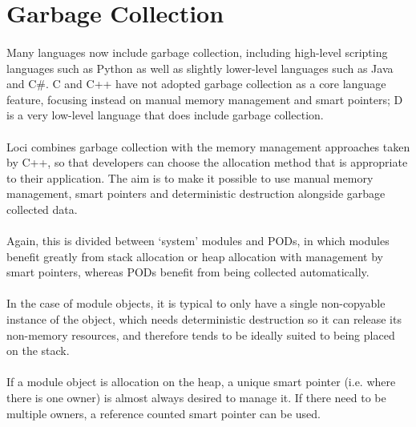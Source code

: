 \documentclass[12pt,twoside,notitlepage]{report}
\begin{document}
\paragraph{}


\section{Garbage Collection}

\paragraph{}
Many languages now include garbage collection, including high-level scripting languages such as Python as well as slightly lower-level languages such as Java and C\#. C and C++ have not adopted garbage collection as a core language feature, focusing instead on manual memory management and smart pointers; D is a very low-level language that does include garbage collection.

\paragraph{}
Loci combines garbage collection with the memory management approaches taken by C++, so that developers can choose the allocation method that is appropriate to their application. The aim is to make it possible to use manual memory management, smart pointers and deterministic destruction alongside garbage collected data.

\paragraph{}
Again, this is divided between `system' modules and PODs, in which modules benefit greatly from stack allocation or heap allocation with management by smart pointers, whereas PODs benefit from being collected automatically.

\paragraph{}
In the case of module objects, it is typical to only have a single non-copyable instance of the object, which needs deterministic destruction so it can release its non-memory resources, and therefore tends to be ideally suited to being placed on the stack.

\paragraph{}
If a module object is allocation on the heap, a unique smart pointer (i.e. where there is one owner) is almost always desired to manage it. If there need to be multiple owners, a reference counted smart pointer can be used.
\end{document}
